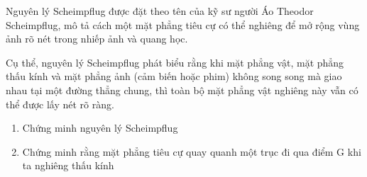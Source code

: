 
Nguyên lý Scheimpflug được đặt theo tên của kỹ sư người Áo Theodor Scheimpflug, mô tả cách một mặt phẳng tiêu cự có thể nghiêng để mở rộng vùng ảnh rõ nét trong nhiếp ảnh và quang học. 

Cụ thể, nguyên lý Scheimpflug phát biểu rằng khi mặt phẳng vật, mặt phẳng thấu kính và mặt phẳng ảnh (cảm biến hoặc phim) không song song mà giao nhau tại một đường thẳng chung, thì toàn bộ mặt phẳng vật nghiêng này vẫn có thể được lấy nét rõ ràng. 
\begin{enumerate}[label=(\alph*)]
\item Chứng minh nguyên lý Scheimpflug
\item Chứng minh rằng mặt phẳng tiêu cự quay quanh một trục đi qua điểm G khi ta nghiêng thấu kính \\
\begin{figure}[H]
    \centering

\begin{tikzpicture}[x=0.75pt,y=0.75pt,yscale=-1,xscale=1]


\end{tikzpicture}
\end{figure}
\end{enumerate}
